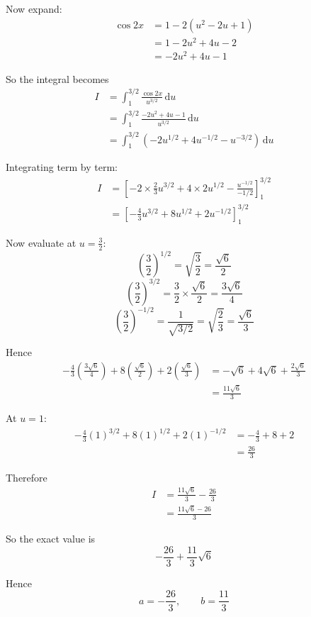 \documentclass[leqno]{article}
\begin{document}
\begin{enumerate}[
  label=\textbf{\arabic*.},
  leftmargin=*,
  topsep=0pt,
  partopsep=0pt,
  parsep=0pt
]
\begin{djsSolution}
Now expand:
\begin{align*}
\cos 2x
&=1-2(u^2-2u+1)\\
&=1-2u^2+4u-2\\
&=-2u^2+4u-1
\end{align*}

So the integral becomes
\begin{align*}
I
&=\int_1^{3/2}\frac{\cos 2x}{u^{3/2}}\,\mathrm{d}u\\
&=\int_1^{3/2}\frac{-2u^2+4u-1}{u^{3/2}}\,\mathrm{d}u\\
&=\int_1^{3/2}\left(-2u^{1/2}+4u^{-1/2}-u^{-3/2}\right)\,\mathrm{d}u
\end{align*}

Integrating term by term:
\begin{align*}
I
&=\left[-2\times\frac{2}{3}u^{3/2}+4\times 2u^{1/2}-\frac{u^{-1/2}}{-1/2}\right]_1^{3/2}\\
&=\left[-\frac{4}{3}u^{3/2}+8u^{1/2}+2u^{-1/2}\right]_1^{3/2}
\end{align*}

Now evaluate at \(u=\frac32\):
\[
\left(\frac32\right)^{1/2}=\sqrt{\frac32}=\frac{\sqrt6}{2}
\]
\[
\left(\frac32\right)^{3/2}=\frac32\times\frac{\sqrt6}{2}=\frac{3\sqrt6}{4}
\]
\[
\left(\frac32\right)^{-1/2}=\frac{1}{\sqrt{3/2}}=\sqrt{\frac23}=\frac{\sqrt6}{3}
\]

Hence
\begin{align*}
-\frac{4}{3}\left(\frac{3\sqrt6}{4}\right)+8\left(\frac{\sqrt6}{2}\right)+2\left(\frac{\sqrt6}{3}\right)
&=-\sqrt6+4\sqrt6+\frac{2\sqrt6}{3}\\
&=\frac{11\sqrt6}{3}
\end{align*}

At \(u=1\):
\begin{align*}
-\frac{4}{3}(1)^{3/2}+8(1)^{1/2}+2(1)^{-1/2}
&=-\frac43+8+2\\
&=\frac{26}{3}
\end{align*}

Therefore
\begin{align*}
I
&=\frac{11\sqrt6}{3}-\frac{26}{3}\\
&=\frac{11\sqrt6-26}{3}
\end{align*}

So the exact value is
\[
-\frac{26}{3}+\frac{11}{3}\sqrt6
\]

Hence
\[
a=-\frac{26}{3}, \qquad b=\frac{11}{3}
\]
\end{djsSolution}


\newpage


\end{enumerate}
\end{document}
